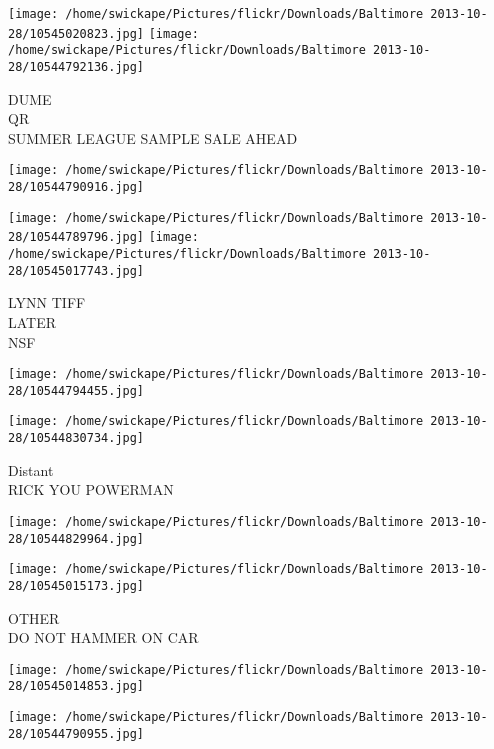 \documentclass[10pt,letterpaper]{article}
\begin{document}
\vspace{0.25in}
\texttt{[image: /home/swickape/Pictures/flickr/Downloads/Baltimore 2013-10-28/10545020823.jpg]}
\texttt{[image: /home/swickape/Pictures/flickr/Downloads/Baltimore 2013-10-28/10544792136.jpg]}

DUME\\
QR\\
SUMMER LEAGUE SAMPLE SALE AHEAD\\
\pagebreak

\texttt{[image: /home/swickape/Pictures/flickr/Downloads/Baltimore 2013-10-28/10544790916.jpg]}

\vspace{0.25in}
\texttt{[image: /home/swickape/Pictures/flickr/Downloads/Baltimore 2013-10-28/10544789796.jpg]}
\texttt{[image: /home/swickape/Pictures/flickr/Downloads/Baltimore 2013-10-28/10545017743.jpg]}

LYNN TIFF\\
LATER\\
NSF\\
\pagebreak

\texttt{[image: /home/swickape/Pictures/flickr/Downloads/Baltimore 2013-10-28/10544794455.jpg]}

\vspace{0.25in}
\texttt{[image: /home/swickape/Pictures/flickr/Downloads/Baltimore 2013-10-28/10544830734.jpg]}

Distant\\
RICK YOU POWERMAN\\
\pagebreak

\texttt{[image: /home/swickape/Pictures/flickr/Downloads/Baltimore 2013-10-28/10544829964.jpg]}

\vspace{0.25in}
\texttt{[image: /home/swickape/Pictures/flickr/Downloads/Baltimore 2013-10-28/10545015173.jpg]}

OTHER\\
DO NOT HAMMER ON CAR\\
\pagebreak

\texttt{[image: /home/swickape/Pictures/flickr/Downloads/Baltimore 2013-10-28/10545014853.jpg]}

\vspace{0.25in}
\texttt{[image: /home/swickape/Pictures/flickr/Downloads/Baltimore 2013-10-28/10544790955.jpg]}
\end{document}
